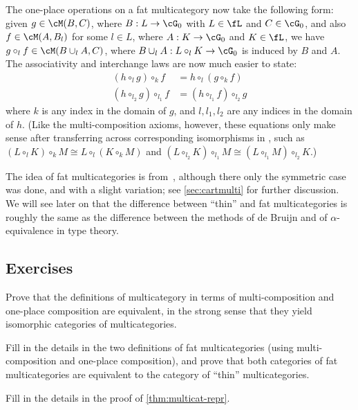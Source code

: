 \documentclass{book}
\begin{document}
The one-place operations on a fat multicategory now take the following form: given $g\in \cM(B,C)$, where $B:L\to \cG_0$ with $L\in\fL$ and $C\in\cG_0$, and also $f\in \cM(A,B_l)$ for some $l\in L$, where $A:K\to \cG_0$ and $K\in \fL$, we have $g\circ_l f \in \cM(B\cup_l A,C)$, where $B\cup_l A:L\circ_l K \to \cG_0$ is induced by $B$ and $A$.
The associativity and interchange laws are now much easier to state:
\begin{align*}
  (h\circ_l g)\circ_k f &= h\circ_l (g\circ_k f) \\
  (h\circ_{l_2} g) \circ_{l_1} f &= (h\circ_{l_1} f) \circ_{l_2} g
\end{align*}
where $k$ is any index in the domain of $g$, and $l,l_1,l_2$ are any indices in the domain of $h$.
(Like the multi-composition axioms, however, these equations only make sense after transferring across corresponding isomorphisms in \fL, such as $(L\circ_l K)\circ_k M\cong L\circ_l (K\circ_k M)$ and $(L\circ_{l_2} K)\circ_{l_1} M \cong (L\circ_{l_1} M)\circ_{l_2} K$.)

The idea of fat multicategories is from~\cite[Appendix A]{leinster:higher-opds}, although there only the symmetric case was done, and with a slight variation; see \cref{sec:cartmulti} for further discussion.
We will see later on that the difference between ``thin'' and fat multicategories is roughly the same as the difference between the methods of de Bruijn and of $\alpha$-equivalence in type theory.


\subsection*{Exercises}

\begin{ex}\label{ex:multicat-defns}
  Prove that the definitions of multicategory in terms of multi-composition and one-place composition are equivalent, in the strong sense that they yield isomorphic categories of multicategories.
\end{ex}

\begin{ex}\label{ex:fat-multicats}
  Fill in the details in the two definitions of fat multicategories (using multi-composition and one-place composition), and prove that both categories of fat multicategories are equivalent to the category of ``thin'' multicategories.
\end{ex}

\begin{ex}\label{ex:multicat-repr}
  Fill in the details in the proof of \cref{thm:multicat-repr}.
\end{ex}
\end{document}
